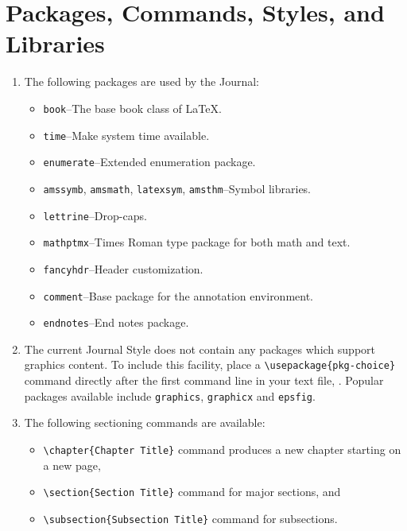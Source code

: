 \section{Packages, Commands, Styles, and Libraries}

\begin{enumerate}

\item The following packages are used by the Journal:
\begin{itemize}
    \item \texttt{book}--The base book class of \LaTeX.
    \item \texttt{time}--Make system time available.
    \item \texttt{enumerate}--Extended enumeration package.
    \item \texttt{amssymb}, \texttt{amsmath}, \texttt{latexsym}, \texttt{amsthm}--Symbol libraries.
    \item \texttt{lettrine}--Drop-caps.
    \item \texttt{mathptmx}--Times Roman type package for both math and text.
    \item \texttt{fancyhdr}--Header customization.
    \item \texttt{comment}--Base package for the annotation environment.
    \item \texttt{endnotes}--End notes package.
\end{itemize}


\item The current Journal Style does not contain any packages which support graphics content.
To include this facility, place a \verb|\usepackage{pkg-choice}| command  directly after
the first command line in your text file, \verb||.  Popular packages available
include \texttt{graphics}, \texttt{graphicx} and \texttt{epsfig}.


\item The following sectioning commands are available:
\begin{itemize}
\item \verb"\chapter{Chapter Title}" command produces a new chapter starting on a new page,
\item \verb"\section{Section Title}" command for major sections, and
\item \verb"\subsection{Subsection Title}" command for subsections.
\end{itemize}


\end{enumerate}
